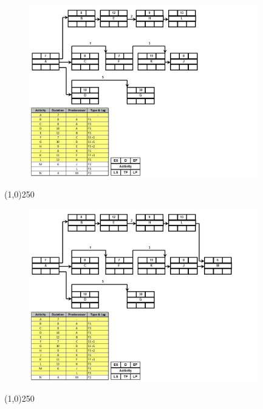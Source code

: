 \begin{frame}
\begin{figure}
	\centering
		\includegraphics[width = 10.0cm]{oldnotes/Slide198.jpg}
\end{figure}
\end{frame}
\begin{center}\line(1,0){250}\end{center}




\begin{frame}
\begin{figure}
	\centering
		\includegraphics[width = 10.0cm]{oldnotes/Slide199.jpg}
\end{figure}
\end{frame}
\begin{center}\line(1,0){250}\end{center}




